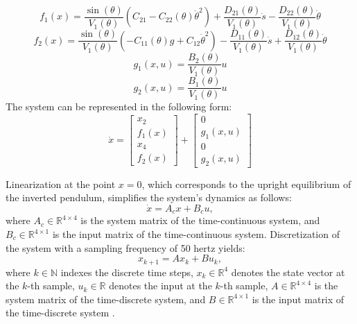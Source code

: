\begin{equation}
	f_1(x) = \frac{\sin(\theta)}{V_1(\theta)} \left( C_{21} - C_{22}(\theta)\dot{\theta}^2 \right) + \frac{D_{21}(\theta)}{V_1(\theta)}\dot{s} - \frac{D_{22}(\theta)}{V_1(\theta)}\dot{\theta}
\end{equation}
\begin{equation}
	f_2(x) = \frac{\sin(\theta)}{V_1(\theta)} \left( -C_{11}(\theta)g + C_{12}\dot{\theta}^2 \right) - \frac{D_{11}(\theta)}{V_1(\theta)}\dot{s} + \frac{D_{12}(\theta)}{V_1(\theta)}\dot{\theta}
\end{equation}
\begin{equation}
	g_1(x,u) = \frac{B_{2}(\theta)}{V_1(\theta)}u
\end{equation}
\begin{equation}
	g_2(x,u) = \frac{B_{1}(\theta)}{V_1(\theta)}u
\end{equation}
The system can be represented in the following form:
\begin{equation}
	\dot{x} = \begin{bmatrix}
		x_2 \\
		f_1(x) \\
		x_4    \\
		f_2(x)
	\end{bmatrix} + \begin{bmatrix}
		0 \\
		g_1(x,u) \\
		0 \\
		g_2(x,u)
	\end{bmatrix}
\end{equation}

Linearization at the point $x = 0$, which corresponds to the upright equilibrium of the inverted pendulum, simplifies the system's dynamics as follows:
\begin{equation}
\dot{x} = A_cx + B_cu,
\end{equation}
where $A_c \in \mathbb{R}^{4\times4}$ is the system matrix of the time-continuous system, and $B_c \in \mathbb{R}^{4\times1}$ is the input matrix of the time-continuous system. Discretization of the system with a sampling frequency of 50 hertz yields:
\begin{equation}
x_{k+1} = Ax_k + Bu_k,
\end{equation}
where $k \in \mathbb{N}$ indexes the discrete time steps, $x_k \in \mathbb{R}^4$ denotes the state vector at the $k$-th sample, $u_k \in \mathbb{R}$ denotes the input at the $k$-th sample, $A \in \mathbb{R}^{4\times4}$ is the system matrix of the time-discrete system, and $B \in \mathbb{R}^{4\times1}$ is the input matrix of the time-discrete system \cite{MastersThesis}.



